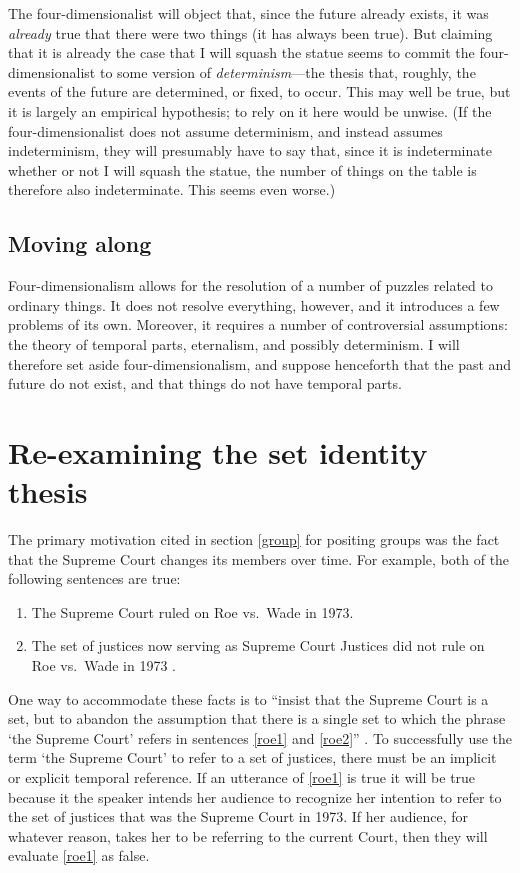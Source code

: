 \documentclass[11pt]{article}
\begin{document}
\begin{spacing}{1.5}
The four-dimensionalist will object that, since the future already
exists, it was {\em already} true that there were two things (it has
always been true).  But claiming that it is already the case that I
will squash the statue seems to commit the four-dimensionalist to some
version of {\em determinism}---the thesis that, roughly, the events of
the future are determined, or fixed, to occur.  This may well be true,
but it is largely an empirical hypothesis; to rely on it here would be
unwise.  (If the four-dimensionalist does not assume determinism, and
instead assumes indeterminism, they will presumably have to say that,
since it is indeterminate whether or not I will squash the statue, the
number of things on the table is therefore also indeterminate.  This
seems even worse.)

\subsection{Moving along}
\label{4dc}
Four-dimensionalism allows for the resolution of a number of puzzles
related to ordinary things.  It does not resolve everything, however,
and it introduces a few problems of its own.  Moreover, it requires a
number of controversial assumptions: the theory of temporal parts,
eternalism, and possibly determinism.  I will therefore set aside
four-dimensionalism, and suppose henceforth that the past and future
do not exist, and that things do not have temporal parts.

\section{Re-examining the set identity thesis}
\label{set-id}
The primary motivation cited in section \ref{group} for positing
groups was the fact that the Supreme Court changes its members over
time.  For example, both of the following sentences are true:

\begin{enumerate}[label=(\arabic*)]
  \item The Supreme Court ruled on Roe vs.\ Wade in 1973. \label{roe1}

  \item The set of justices now serving as Supreme Court Justices did
    not rule on Roe vs.\ Wade in 1973
    \citep[135]{uzquiano2004a}. \label{roe2}
\end{enumerate}

One way to accommodate these facts is to ``insist that the Supreme
Court is a set, but to abandon the assumption that there is a single
set to which the phrase `the Supreme Court' refers in sentences
\ref{roe1} and \ref{roe2}'' \citep[138]{uzquiano2004a}.  To
successfully use the term `the Supreme Court' to refer to a set of
justices, there must be an implicit or explicit temporal reference.
If an utterance of \ref{roe1} is true it will be true because it the
speaker intends her audience to recognize her intention to refer to
the set of justices that was the Supreme Court in 1973.  If her
audience, for whatever reason, takes her to be referring to the
current Court, then they will evaluate \ref{roe1} as false.


\end{spacing}
\end{document}
